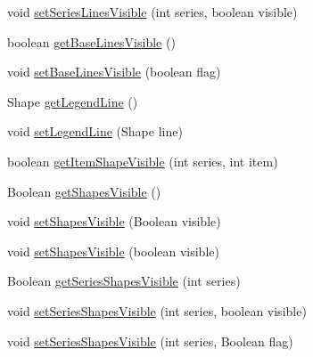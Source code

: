 \begin{DoxyCompactItemize}
\item 
void \mbox{\hyperlink{classorg_1_1jfree_1_1chart_1_1renderer_1_1xy_1_1_x_y_line_and_shape_renderer_aa414d34084cd31dc188eedd403179cc4}{set\+Series\+Lines\+Visible}} (int series, boolean visible)
\item 
boolean \mbox{\hyperlink{classorg_1_1jfree_1_1chart_1_1renderer_1_1xy_1_1_x_y_line_and_shape_renderer_ae4936ca796693774fc451006f173b828}{get\+Base\+Lines\+Visible}} ()
\item 
void \mbox{\hyperlink{classorg_1_1jfree_1_1chart_1_1renderer_1_1xy_1_1_x_y_line_and_shape_renderer_a002c8d4d7b0aa797144d144a90e3e4b0}{set\+Base\+Lines\+Visible}} (boolean flag)
\item 
Shape \mbox{\hyperlink{classorg_1_1jfree_1_1chart_1_1renderer_1_1xy_1_1_x_y_line_and_shape_renderer_ae016f74b6e454ecf1143b2e542aa35cc}{get\+Legend\+Line}} ()
\item 
void \mbox{\hyperlink{classorg_1_1jfree_1_1chart_1_1renderer_1_1xy_1_1_x_y_line_and_shape_renderer_ad7e97da27d2d5c3b9eb1c3a89d471e19}{set\+Legend\+Line}} (Shape line)
\item 
boolean \mbox{\hyperlink{classorg_1_1jfree_1_1chart_1_1renderer_1_1xy_1_1_x_y_line_and_shape_renderer_aa3d897d42e0275c02a93484d44d7e01b}{get\+Item\+Shape\+Visible}} (int series, int item)
\item 
Boolean \mbox{\hyperlink{classorg_1_1jfree_1_1chart_1_1renderer_1_1xy_1_1_x_y_line_and_shape_renderer_a25d79c5f041107df31533fbc2b9f6d62}{get\+Shapes\+Visible}} ()
\item 
void \mbox{\hyperlink{classorg_1_1jfree_1_1chart_1_1renderer_1_1xy_1_1_x_y_line_and_shape_renderer_a1e887ed2b1e631fa9da701341b764c43}{set\+Shapes\+Visible}} (Boolean visible)
\item 
void \mbox{\hyperlink{classorg_1_1jfree_1_1chart_1_1renderer_1_1xy_1_1_x_y_line_and_shape_renderer_af3312da79ca25e4f2e19c65a298b8874}{set\+Shapes\+Visible}} (boolean visible)
\item 
Boolean \mbox{\hyperlink{classorg_1_1jfree_1_1chart_1_1renderer_1_1xy_1_1_x_y_line_and_shape_renderer_a3021273363552d317fa7cf150a012141}{get\+Series\+Shapes\+Visible}} (int series)
\item 
void \mbox{\hyperlink{classorg_1_1jfree_1_1chart_1_1renderer_1_1xy_1_1_x_y_line_and_shape_renderer_a314b2d8b5b0ac7741826221a54d66536}{set\+Series\+Shapes\+Visible}} (int series, boolean visible)
\item 
void \mbox{\hyperlink{classorg_1_1jfree_1_1chart_1_1renderer_1_1xy_1_1_x_y_line_and_shape_renderer_a52a7cf419f31dc7824110cf4ed4f1597}{set\+Series\+Shapes\+Visible}} (int series, Boolean flag)

\end{DoxyCompactItemize}
